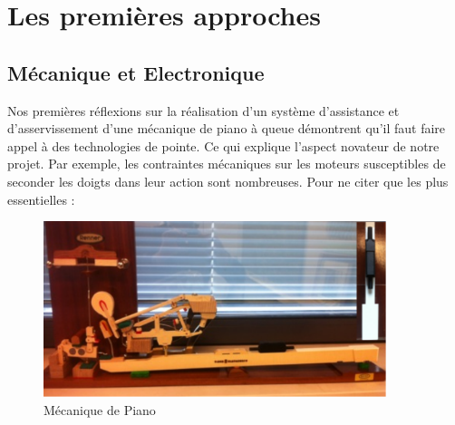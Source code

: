 \documentclass[french,a4paper,12pt]{report}
\begin{document}
\chapter{Les premières approches}

  \section{Mécanique et Electronique}
Nos premières réflexions sur la réalisation d’un système d’assistance et d’asservissement d’une mécanique de piano à queue démontrent qu’il faut faire appel à des technologies de pointe. Ce qui explique l’aspect novateur de notre projet. Par exemple, les contraintes mécaniques sur les moteurs susceptibles de seconder les doigts dans leur action sont nombreuses. Pour ne citer que les plus essentielles :\newline

	\begin{figure}[!ht]
    \center
    \includegraphics[width=10cm]{MECA_PIANO2.png}
    \caption{Mécanique de Piano}
	\end{figure} 

\end{document}
